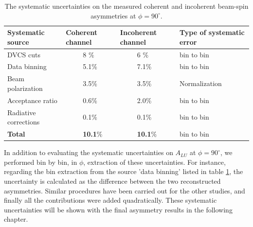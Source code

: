 \begin {table}[!h]
\begin{center}
\begin{tabular}{|l|l|l|l|}
\hline
Systematic source &  Coherent channel  & Incoherent channel &Type of systematic 
error\\
\hline
DVCS cuts & ~~~~~8 $\%$ &  ~~~~~6 $\%$ & bin to bin\\
\hline
Data binning & ~~~~~5.1$\%$ & ~~~~~7.1$\%$ &bin to bin\\
\hline
Beam polarization &  ~~~~~3.5$\%$ &  ~~~~~3.5$\%$& Normalization\\
\hline
Acceptance ratio &  ~~~~~0.6$\%$ &  ~~~~~2.0$\%$ &bin to bin\\
\hline
Radiative corrections &  ~~~~~0.1$\%$ & ~~~~~0.1$\%$ & bin to bin\\
\hline
\textbf{Total} &  ~~~~~\textbf{10.1}$\%$ &   ~~~~~\textbf{10.1}$\%$ &bin to 
bin\\
\hline
\end{tabular}
\caption{The systematic uncertainties on the measured coherent and incoherent 
beam-spin asymmetries at $\phi = 90^{\circ}$.}
\label{Table:systematic_uncertainties}
\end{center}
\end{table}

In addition to evaluating the systematic uncertainties on $A_{LU}$ at $\phi = 
90^{\circ}$, we performed bin by bin, in $\phi$, extraction of these 
uncertainties. For instance, regarding the bin extraction from the source 'data 
binning' listed in table \ref{Table:systematic_uncertainties}, the uncertainty 
is calculated as the difference between the two reconstructed asymmetries.  
Similar procedures have been carried out for the other studies, and finally all 
the contributions were added quadratically. These systematic uncertainties will 
be shown with the final asymmetry results in the following chapter.  

